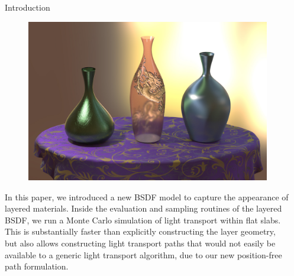 \documentclass[final]{beamer}
\newlength{\sepwid}
\newlength{\twocolwid}
\begin{document}
\begin{frame}[t] %
\vspace{-1.5cm}
\begin{columns}[t] %
    \begin{column}{\sepwid}\end{column} %
    \begin{column}{\twocolwid} %
        \begin{block}{Introduction}
            \begin{figure}
                \includegraphics[width=0.9\linewidth]{teaser/teaser.jpg}
            \end{figure}
        
            \large{
            In this paper, we introduced a new BSDF model to capture the appearance of layered materials. 
            Inside the evaluation and sampling routines of the layered BSDF, we run a Monte Carlo simulation of light transport within flat slabs. 
            This is substantially faster than explicitly constructing the layer geometry, 
            but also allows constructing light transport paths that would not easily be available to a generic light transport algorithm, 
            due to our new position-free path formulation.
            
            \vspace{1cm}
            
}
\end{block}
\end{column}
\end{columns}
\end{frame}
\end{document}
